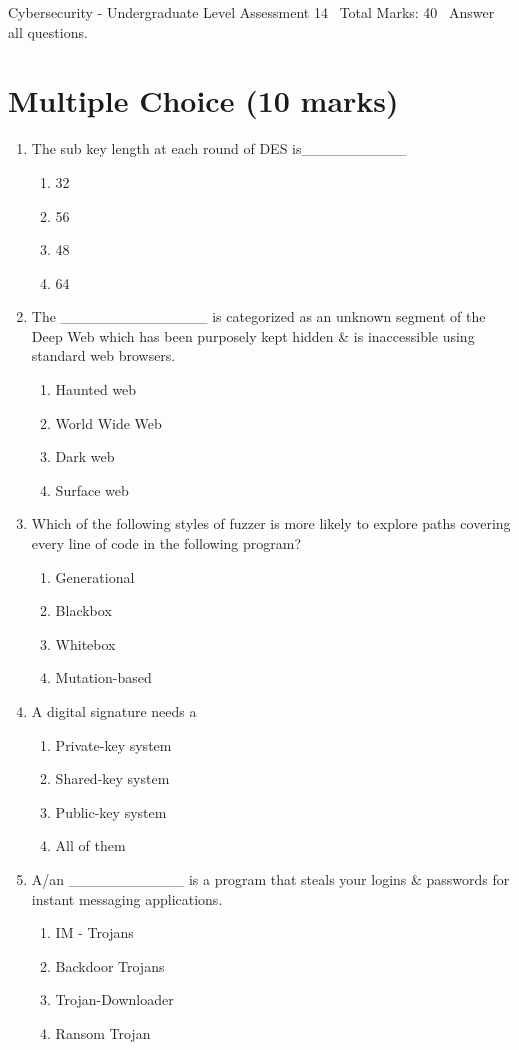\documentclass[12pt]{article}
\begin{document}
\begin{center}
Cybersecurity - Undergraduate Level Assessment 14 \
Total Marks: 40 \
Answer all questions.
\end{center}

\section*{Multiple Choice (10 marks)}
\begin{enumerate}[label=\arabic*.]
\item The sub key length at each round of DES is\_\_\_\_\_\_\_\_\_\_
\begin{enumerate}[label=(\alph*)]
    \item 32
    \item 56
    \item 48
    \item 64
\end{enumerate}
\item The \_\_\_\_\_\_\_\_\_\_\_\_\_\_ is categorized as an unknown segment of the Deep Web which has been purposely kept hidden \& is inaccessible using standard web browsers.
\begin{enumerate}[label=(\alph*)]
    \item Haunted web
    \item World Wide Web
    \item Dark web
    \item Surface web
\end{enumerate}
\item Which of the following styles of fuzzer is more likely to explore paths covering every line of code in the following program?
\begin{enumerate}[label=(\alph*)]
    \item Generational
    \item Blackbox
    \item Whitebox
    \item Mutation-based
\end{enumerate}
\item A digital signature needs a
\begin{enumerate}[label=(\alph*)]
    \item Private-key system
    \item Shared-key system
    \item Public-key system
    \item All of them
\end{enumerate}
\item A/an \_\_\_\_\_\_\_\_\_\_\_ is a program that steals your logins \& passwords for instant messaging applications.
\begin{enumerate}[label=(\alph*)]
    \item IM - Trojans
    \item Backdoor Trojans
    \item Trojan-Downloader
    \item Ransom Trojan
\end{enumerate}
\end{enumerate}
\end{document}
